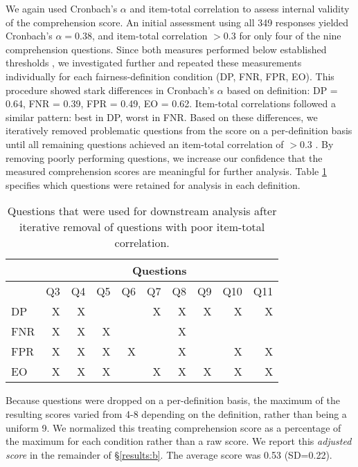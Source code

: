\documentclass{article}
\begin{document}
We again used Cronbach's $\alpha$ and item-total correlation to assess internal validity of the comprehension score. An initial assessment using all 349 responses yielded Cronbach's $\alpha = 0.38$, and item-total correlation $> 0.3$ for only four of the nine comprehension questions. Since both measures performed below established thresholds \cite{nunnally1978,everitt2010}, we investigated further and repeated these measurements individually for each fairness-definition condition (DP, FNR, FPR, EO). This procedure showed stark differences in Cronbach's $\alpha$ based on definition: DP = 0.64, FNR = 0.39, FPR = 0.49, EO = 0.62. Item-total correlations followed a similar pattern:  best in DP, worst in FNR. Based on these differences, we iteratively removed problematic questions from the score on a per-definition basis until all remaining questions achieved an item-total correlation of $> 0.3$ \cite{everitt2010}.
By removing poorly performing questions, we 
increase our confidence that the measured comprehension scores are meaningful for further analysis. Table \ref{tab:dropped_qs} specifies which questions were retained for analysis in each definition.
\vspace{-10pt}
\begin{table}[ht]
\centering
\caption{\label{tab:dropped_qs} Questions that were used for downstream analysis after iterative removal of questions with poor item-total correlation.}
\vspace{5pt}
{\small
\begin{tabular}{@{}lrrrrrrrrr@{}}
    \toprule
     & \multicolumn{9}{c}{\textbf{Questions}}\\
    \midrule
     & Q3 & Q4 & Q5 & Q6 & Q7 & Q8 & Q9 & Q10 & Q11\\
    \midrule
    DP & X & X &  &  & X & X & X & X & X \\
    FNR & X & X & X &  &  & X &  &  &   \\
    FPR & X & X & X & X &  & X &  & X & X \\
    EO & X & X & X &  & X & X & X & X & X \\
    \bottomrule
\end{tabular}}
\end{table}



Because questions were dropped on a per-definition basis, the maximum of the resulting scores varied from 4-8 depending on the definition, rather than being a uniform 9. We normalized this treating comprehension score as a percentage of the maximum for each condition rather than a raw score. We report this \textit{adjusted score} in the remainder of \S\ref{results:b}. The average score was 0.53 (SD=0.22).
\end{document}
